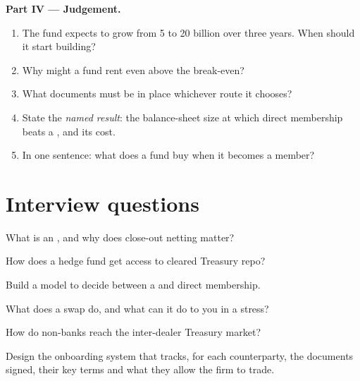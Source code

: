 \begin{problem}
\medskip\noindent\textbf{Part IV --- Judgement.}
\begin{enumerate}[resume]
\item The fund expects to grow from 5 to 20 billion over three years. When should it
start building?
\item Why might a fund rent even above the break-even?
\item What documents must be in place whichever route it chooses?
\item State the \emph{named result}: the balance-sheet size at which direct membership
beats a , and its cost.
\item In one sentence: what does a fund buy when it becomes a member?
\end{enumerate}
\end{problem}

\section{Interview questions}

\begin{interviewq}\label{iq:m2:getting-access-rates-credit:1}
What is an , and why does close-out netting matter?
\end{interviewq}

\begin{interviewq}\label{iq:m2:getting-access-rates-credit:2}
How does a hedge fund get access to cleared Treasury repo?
\end{interviewq}

\begin{interviewq}\label{iq:m2:getting-access-rates-credit:3}
Build a model to decide between a  and direct membership.
\end{interviewq}

\begin{interviewq}\label{iq:m2:getting-access-rates-credit:4}
What does a swap  do, and what can it do to you in a stress?
\end{interviewq}

\begin{interviewq}\label{iq:m2:getting-access-rates-credit:5}
How do non-banks reach the inter-dealer Treasury market?
\end{interviewq}

\begin{interviewq}\label{iq:m2:getting-access-rates-credit:6}
Design the onboarding system that tracks, for each counterparty, the documents signed,
their key terms and what they allow the firm to trade.
\end{interviewq}
